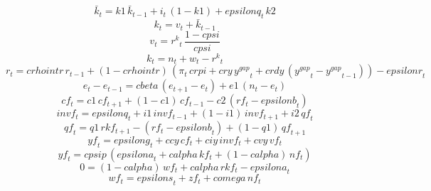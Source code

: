 \begin{dmath}
{{\bar{k}}}_{t}={k1}\, {{\bar{k}}}_{t-1}+{{i}}_{t}\, \left(1-{k1}\right)+{epsilonq}_{t}\, {k2}
\end{dmath}
\begin{dmath}
{{k}}_{t}={{v}}_{t}+{{\bar{k}}}_{t-1}
\end{dmath}
\begin{dmath}
{{v}}_{t}={{r^{k}}}_{t}\, \frac{1-{cpsi}}{{cpsi}}
\end{dmath}
\begin{dmath}
{{k}}_{t}={{n}}_{t}+{{w}}_{t}-{{r^{k}}}_{t}
\end{dmath}
\begin{dmath}
{{r}}_{t}={crhointr}\, {{r}}_{t-1}+\left(1-{crhointr}\right)\, \left({{\pi}}_{t}\, {crpi}+{cry}\, {{y^{gap}}}_{t}+{crdy}\, \left({{y^{gap}}}_{t}-{{y^{gap}}}_{t-1}\right)\right)-{epsilonr}_{t}
\end{dmath}
\begin{dmath}
{{e}}_{t}-{{e}}_{t-1}={cbeta}\, \left({{e}}_{t+1}-{{e}}_{t}\right)+{e1}\, \left({{n}}_{t}-{{e}}_{t}\right)
\end{dmath}
\begin{dmath}
{cf}_{t}={c1}\, {cf}_{t+1}+\left(1-{c1}\right)\, {cf}_{t-1}-{c2}\, \left({rf}_{t}-{epsilonb}_{t}\right)
\end{dmath}
\begin{dmath}
{invf}_{t}={epsilonq}_{t}+{i1}\, {invf}_{t-1}+\left(1-{i1}\right)\, {invf}_{t+1}+{i2}\, {qf}_{t}
\end{dmath}
\begin{dmath}
{qf}_{t}={q1}\, {rkf}_{t+1}-\left({rf}_{t}-{epsilonb}_{t}\right)+\left(1-{q1}\right)\, {qf}_{t+1}
\end{dmath}
\begin{dmath}
{yf}_{t}={epsilong}_{t}+{ccy}\, {cf}_{t}+{ciy}\, {invf}_{t}+{cvy}\, {vf}_{t}
\end{dmath}
\begin{dmath}
{yf}_{t}={cpsip}\, \left({epsilona}_{t}+{calpha}\, {kf}_{t}+\left(1-{calpha}\right)\, {nf}_{t}\right)
\end{dmath}
\begin{dmath}
0=\left(1-{calpha}\right)\, {wf}_{t}+{calpha}\, {rkf}_{t}-{epsilona}_{t}
\end{dmath}
\begin{dmath}
{wf}_{t}={epsilons}_{t}+{zf}_{t}+{comega}\, {nf}_{t}
\end{dmath}
